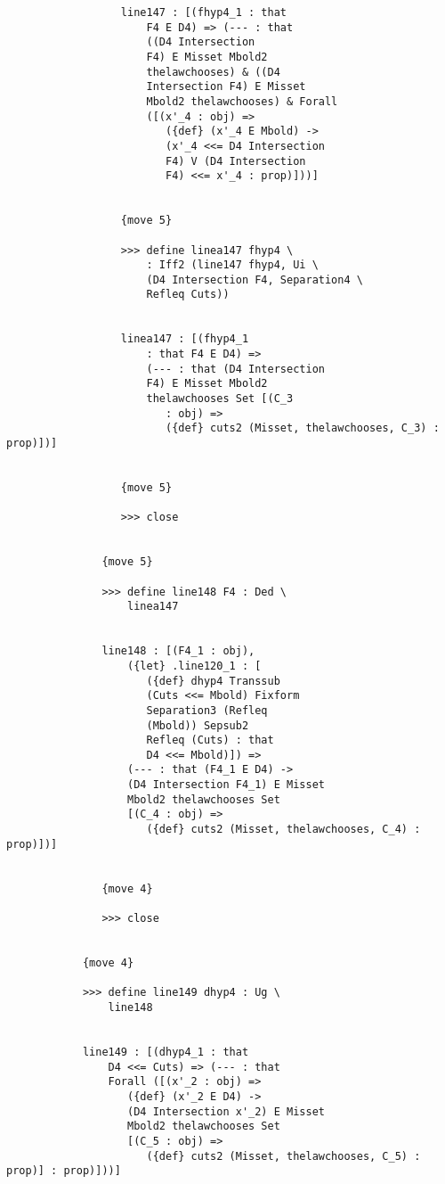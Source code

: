 \documentclass[12pt]{article}
\begin{document}
\begin{verbatim}
                  line147 : [(fhyp4_1 : that 
                      F4 E D4) => (--- : that 
                      ((D4 Intersection 
                      F4) E Misset Mbold2 
                      thelawchooses) & ((D4 
                      Intersection F4) E Misset 
                      Mbold2 thelawchooses) & Forall 
                      ([(x'_4 : obj) => 
                         ({def} (x'_4 E Mbold) -> 
                         (x'_4 <<= D4 Intersection 
                         F4) V (D4 Intersection 
                         F4) <<= x'_4 : prop)]))]


                  {move 5}

                  >>> define linea147 fhyp4 \
                      : Iff2 (line147 fhyp4, Ui \
                      (D4 Intersection F4, Separation4 \
                      Refleq Cuts))


                  linea147 : [(fhyp4_1 
                      : that F4 E D4) => 
                      (--- : that (D4 Intersection 
                      F4) E Misset Mbold2 
                      thelawchooses Set [(C_3 
                         : obj) => 
                         ({def} cuts2 (Misset, thelawchooses, C_3) : prop)])]


                  {move 5}

                  >>> close


               {move 5}

               >>> define line148 F4 : Ded \
                   linea147


               line148 : [(F4_1 : obj), 
                   ({let} .line120_1 : [
                      ({def} dhyp4 Transsub 
                      (Cuts <<= Mbold) Fixform 
                      Separation3 (Refleq 
                      (Mbold)) Sepsub2 
                      Refleq (Cuts) : that 
                      D4 <<= Mbold)]) => 
                   (--- : that (F4_1 E D4) -> 
                   (D4 Intersection F4_1) E Misset 
                   Mbold2 thelawchooses Set 
                   [(C_4 : obj) => 
                      ({def} cuts2 (Misset, thelawchooses, C_4) : prop)])]


               {move 4}

               >>> close


            {move 4}

            >>> define line149 dhyp4 : Ug \
                line148


            line149 : [(dhyp4_1 : that 
                D4 <<= Cuts) => (--- : that 
                Forall ([(x'_2 : obj) => 
                   ({def} (x'_2 E D4) -> 
                   (D4 Intersection x'_2) E Misset 
                   Mbold2 thelawchooses Set 
                   [(C_5 : obj) => 
                      ({def} cuts2 (Misset, thelawchooses, C_5) : prop)] : prop)]))]



\end{verbatim}
\end{document}
